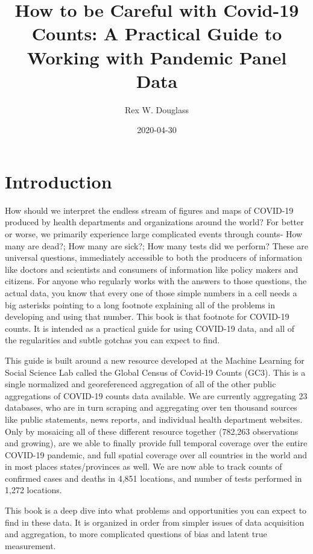 \documentclass[
]{book}
\title{How to be Careful with Covid-19 Counts: A Practical Guide to Working with Pandemic Panel Data}
\author{Rex W. Douglass}
\date{2020-04-30}
\begin{document}
\maketitle

{
\setcounter{tocdepth}{1}
\tableofcontents
}
\hypertarget{intro}{%
\chapter{Introduction}\label{intro}}

How should we interpret the endless stream of figures and maps of COVID-19 produced by health departments and organizations around the world? For better or worse, we primarily experience large complicated events through counts- How many are dead?; How many are sick?; How many tests did we perform? These are universal questions, immediately accessible to both the producers of information like doctors and scientists and consumers of information like policy makers and citizens. For anyone who regularly works with the answers to those questions, the actual data, you know that every one of those simple numbers in a cell needs a big asterisks pointing to a long footnote explaining all of the problems in developing and using that number. This book is that footnote for COVID-19 counts. It is intended as a practical guide for using COVID-19 data, and all of the regularities and subtle gotchas you can expect to find.

This guide is built around a new resource developed at the Machine Learning for Social Science Lab called the Global Census of Covid-19 Counts (GC3). This is a single normalized and georeferenced aggregation of all of the other public aggregations of COVID-19 counts data available. We are currently aggregating 23 databases, who are in turn scraping and aggregating over ten thousand sources like public statements, news reports, and individual health department websites. Only by mosaicing all of these different resource together (782,263 observations and growing), are we able to finally provide full temporal coverage over the entire COVID-19 pandemic, and full spatial coverage over all countries in the world and in most places states/provinces as well. We are now able to track counts of confirmed cases and deaths in 4,851 locations, and number of tests performed in 1,272 locations.

This book is a deep dive into what problems and opportunities you can expect to find in these data. It is organized in order from simpler issues of data acquisition and aggregation, to more complicated questions of bias and latent true measurement.
\end{document}
